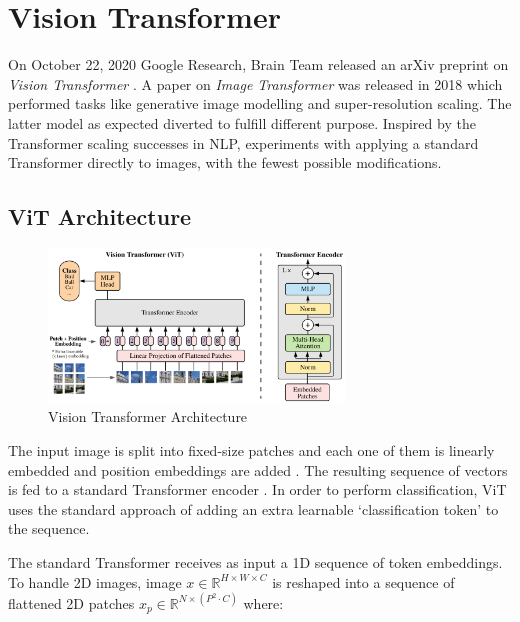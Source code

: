 \documentclass[12pt, a4paper]{report}
\begin{document}
\section{Vision Transformer}
\label{sec:vit}

\hspace{0.5cm} On October 22, 2020 Google Research, Brain Team released an arXiv preprint on \emph{Vision Transformer} \cite{2020arXiv201011929D}. A paper on \emph{Image Transformer} was released in 2018 \cite{2018arXiv180205751P} which performed tasks like generative image modelling and super-resolution scaling. The latter model as expected diverted to fulfill different purpose. Inspired by the Transformer scaling successes in NLP, \cite{2020arXiv201011929D} experiments with applying a standard Transformer \cite{2017arXiv170603762V} directly to images, with the fewest possible modifications.

\subsection{ViT Architecture}
\label{subsec:vitarch}

\begin{figure}[!htbp]
    \centering
    \includegraphics[width=0.7\textwidth]{vision_transformer.png}
    \caption[Vision Transformer Architecture]{Vision Transformer Architecture \cite{2020arXiv201011929D}}
    \label{fig:5.4}
\end{figure}

The input image is split into fixed-size patches and each one of them is linearly embedded and position embeddings are added \cite{wiki:word2vec}. The resulting sequence of vectors is fed to a standard Transformer encoder \cite{2017arXiv170603762V}. In order to perform classification, ViT uses the standard approach of adding an extra learnable `classification token' to the sequence.

The standard Transformer receives as input a 1D sequence of token embeddings. To handle 2D images, image $x \in \mathbb{R}^{H\times W\times C}$ is reshaped into a sequence of flattened 2D patches $x_p \in \mathbb{R}^{N\times (P^2 \cdot C)}$ where:
\end{document}
